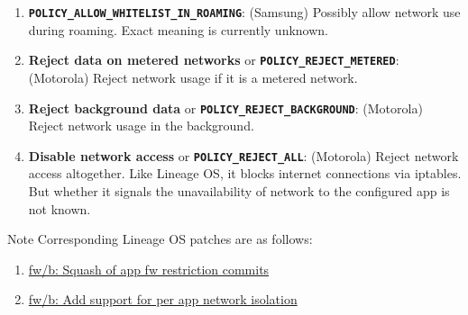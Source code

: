 \begin{enumerate}
    \item \textbf{\texttt{POLICY\_ALLOW\_WHITELIST\_IN\_ROAMING}}: (Samsung) Possibly allow network use during roaming.
    Exact meaning is currently unknown.

    \item \textbf{Reject data on metered networks} or \textbf{\texttt{POLICY\_REJECT\_METERED}}: (Motorola) Reject network usage if it is a metered network.

    \item \textbf{Reject background data} or \textbf{\texttt{POLICY\_REJECT\_BACKGROUND}}: (Motorola) Reject network usage in the background.

    \item \textbf{Disable network access} or \textbf{\texttt{POLICY\_REJECT\_ALL}}: (Motorola) Reject network access altogether.
    Like Lineage OS, it blocks internet connections via iptables. But whether it signals the unavailability of network to the configured app is not known.
\end{enumerate}

\begin{tip}{Note}
    Corresponding Lineage OS patches are as follows:
    \begin{enumerate}
        \item \href{https://github.com/LineageOS/android\_frameworks\_base/commit/a04932bafbbf7d99efd18276152cc2c9c9b2073e}{fw/b: Squash of app fw restriction commits}
        \item \href{https://github.com/LineageOS/android\_frameworks\_base/commit/02c8c82854348f52afe2199f310f44b5f578b5b8}{fw/b: Add support for per app network isolation}
    \end{enumerate}
\end{tip}
